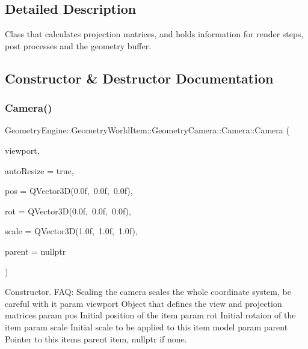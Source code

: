 \subsection{Detailed Description}
Class that calculates projection matrices, and holds information for render steps, post processes and the geometry buffer. 

\subsection{Constructor \& Destructor Documentation}
\mbox{\label{class_geometry_engine_1_1_geometry_world_item_1_1_geometry_camera_1_1_camera_a56a7538e5e5d2141832824bba448e271}} 
\subsubsection{\texorpdfstring{Camera()}{Camera()}\hspace{0.1cm}{\footnotesize\ttfamily [1/2]}}
{\footnotesize\ttfamily Geometry\+Engine\+::\+Geometry\+World\+Item\+::\+Geometry\+Camera\+::\+Camera\+::\+Camera (\begin{DoxyParamCaption}\item[{const \mbox{\hyperlink{class_geometry_engine_1_1_geometry_item_utils_1_1_viewport}{Geometry\+Item\+Utils\+::\+Viewport}} \&}]{viewport,  }\item[{bool}]{auto\+Resize = {\ttfamily true},  }\item[{const Q\+Vector3D \&}]{pos = {\ttfamily QVector3D(0.0f,~0.0f,~0.0f)},  }\item[{const Q\+Vector3D \&}]{rot = {\ttfamily QVector3D(0.0f,~0.0f,~0.0f)},  }\item[{const Q\+Vector3D \&}]{scale = {\ttfamily QVector3D(1.0f,~1.0f,~1.0f)},  }\item[{\mbox{\hyperlink{class_geometry_engine_1_1_geometry_world_item_1_1_world_item}{World\+Item}} $\ast$}]{parent = {\ttfamily nullptr} }\end{DoxyParamCaption})}

Constructor. F\+AQ\+: Scaling the camera scales the whole coordinate system, be careful with it param viewport Object that defines the view and projection matrices param pos Initial position of the item param rot Initial rotaion of the item param scale Initial scale to be applied to this item model param parent Pointer to this items parent item, nullptr if none. \mbox{\label{class_geometry_engine_1_1_geometry_world_item_1_1_geometry_camera_1_1_camera_afac761f35401ea99ef72dd2412b71cfc}} 
